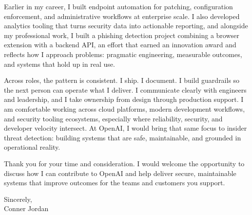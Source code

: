 \documentclass[letterpaper,11pt]{article}
\begin{document}
\vspace{16pt}

Earlier in my career, I built endpoint automation for patching, configuration enforcement, and administrative workflows at enterprise scale. I also developed analytics tooling that turns security data into actionable reporting, and alongside my professional work, I built a phishing detection project combining a browser extension with a backend API, an effort that earned an innovation award and reflects how I approach problems: pragmatic engineering, measurable outcomes, and systems that hold up in real use.

\vspace{16pt}

Across roles, the pattern is consistent. I ship. I document. I build guardrails so the next person can operate what I deliver. I communicate clearly with engineers and leadership, and I take ownership from design through production support. I am comfortable working across cloud platforms, modern development workflows, and security tooling ecosystems, especially where reliability, security, and developer velocity intersect. At OpenAI, I would bring that same focus to insider threat detection: building systems that are safe, maintainable, and grounded in operational reality.

\vspace{16pt}

Thank you for your time and consideration. I would welcome the opportunity to discuss how I can contribute to OpenAI and help deliver secure, maintainable systems that improve outcomes for the teams and customers you support.

\vspace{16pt}

Sincerely,\\
Conner Jordan
\end{document}
